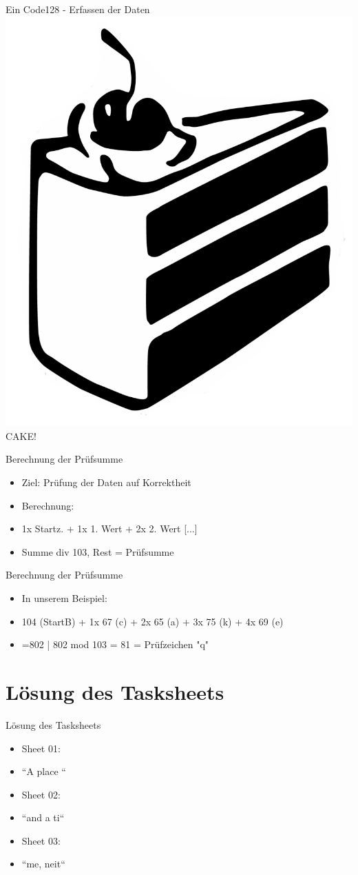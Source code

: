 \begin{frame}{Ein Code128 - Erfassen der Daten}
	\hfill\includegraphics[width=.35\textwidth]{muzy/cake.png}\hfill\hbox{}
	\hfill CAKE! \hfill\hbox{}
\end{frame}

\begin{frame}{Berechnung der Prüfsumme}
	\begin{itemize}
	\item Ziel: Prüfung der Daten auf Korrektheit
	\item Berechnung: 
	\item 1x Startz. + 1x 1. Wert + 2x 2. Wert [...]
	\item Summe div 103, Rest = Prüfsumme	
	\end{itemize}
\end{frame}

\begin{frame}{Berechnung der Prüfsumme}
	\begin{itemize}
	\item In unserem Beispiel:
	\item 104 (StartB) + 1x 67 (c) + 2x 65 (a) + 3x 75 (k) + 4x 69 (e)
	\item =802 | 802 mod 103 = 81 = Prüfzeichen "q"
	\end{itemize}
\end{frame}

\section{Lösung des Tasksheets}
\begin {frame}[<+->]{Lösung des Tasksheets}
	\begin{itemize}
	\item Sheet 01:
	\item ``A place ``
	\item Sheet 02:
	\item ``and a ti``
	\item Sheet 03:
	\item ``me, neit`` 
	\end{itemize}
\end{frame}

